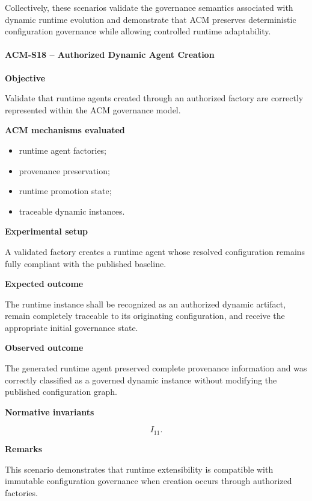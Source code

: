 \documentclass[10pt]{article}
\begin{document}
Collectively, these scenarios validate the governance semantics associated with
dynamic runtime evolution and demonstrate that ACM preserves deterministic
configuration governance while allowing controlled runtime adaptability.

\paragraph{ACM-S18 -- Authorized Dynamic Agent Creation}

\textbf{Objective}

Validate that runtime agents created through an authorized factory are
correctly represented within the ACM governance model.

\textbf{ACM mechanisms evaluated}

\begin{itemize}
    \item runtime agent factories;
    \item provenance preservation;
    \item runtime promotion state;
    \item traceable dynamic instances.
\end{itemize}

\textbf{Experimental setup}

A validated factory creates a runtime agent whose resolved configuration
remains fully compliant with the published baseline.

\textbf{Expected outcome}

The runtime instance shall be recognized as an authorized dynamic artifact,
remain completely traceable to its originating configuration, and receive the
appropriate initial governance state.

\textbf{Observed outcome}

The generated runtime agent preserved complete provenance information and was
correctly classified as a governed dynamic instance without modifying the
published configuration graph.

\textbf{Normative invariants}

\[
I_{11}.
\]

\textbf{Remarks}

This scenario demonstrates that runtime extensibility is compatible with
immutable configuration governance when creation occurs through authorized
factories.

\end{document}
